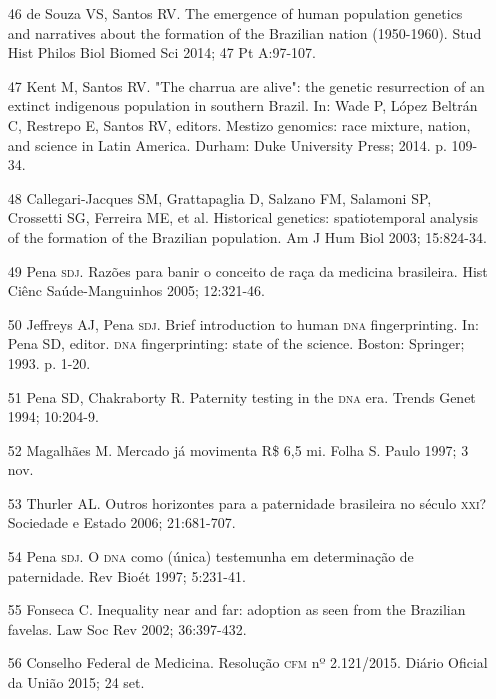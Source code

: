 \documentclass{article}
\begin{document}
\begin{itemize}
\item[46] de Souza VS, Santos RV. The emergence of human population genetics
and narratives about the formation of the Brazilian nation (1950-1960). Stud
Hist Philos Biol Biomed Sci 2014; 47 Pt A:97-107.

\item[47] Kent M, Santos RV. "The charrua are alive": the genetic
resurrection of an extinct indigenous population in southern Brazil. In: Wade P,
López Beltrán C, Restrepo E, Santos RV, editors. Mestizo genomics: race mixture,
nation, and science in Latin America. Durham: Duke University Press; 2014. p.
109-34.

\item[48] Callegari-Jacques SM, Grattapaglia D, Salzano FM, Salamoni SP,
Crossetti SG, Ferreira ME, et al. Historical genetics: spatiotemporal analysis
of the formation of the Brazilian population. Am J Hum Biol 2003; 15:824-34.

\item[49] Pena \textsc{sdj}. Razões para banir o conceito de raça da medicina
brasileira. Hist Ciênc Saúde-Manguinhos 2005; 12:321-46.

\item[50] Jeffreys AJ, Pena \textsc{sdj}. Brief introduction to human \textsc{dna}
fingerprinting. In: Pena SD, editor. \textsc{dna} fingerprinting: state of the science.
Boston: Springer; 1993. p. 1-20.

\item[51] Pena SD, Chakraborty R. Paternity testing in the \textsc{dna} era. Trends
Genet 1994; 10:204-9.

\item[52] Magalhães M. Mercado já movimenta R\$ 6,5 mi. Folha S. Paulo 1997;
3 nov.

\item[53] Thurler AL. Outros horizontes para a paternidade brasileira no
século \textsc{xxi}? Sociedade e Estado 2006; 21:681-707.

\item[54] Pena \textsc{sdj}. O \textsc{dna} como (única) testemunha em determinação de
paternidade. Rev Bioét 1997; 5:231-41.

\item[55] Fonseca C. Inequality near and far: adoption as seen from the
Brazilian favelas. Law Soc Rev 2002; 36:397-432.

\item[56] Conselho Federal de Medicina. Resolução \textsc{cfm} nº 2.121/2015. Diário
Oficial da União 2015; 24 set.


\end{itemize}
\end{document}
